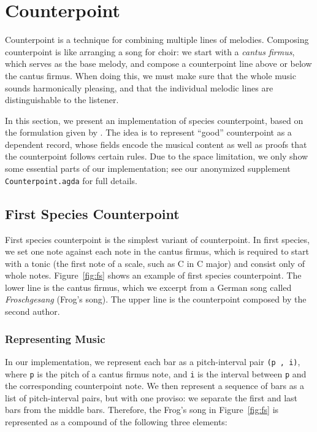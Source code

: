 \section{Counterpoint}
\label{sec:cp}

Counterpoint is a technique for combining multiple lines of melodies.
Composing counterpoint is like arranging a song for choir:
we start with a \emph{cantus firmus}, which serves as the base melody,
and compose a counterpoint line above or below the cantus firmus.
When doing this, we must make sure that the whole music sounds
harmonically pleasing, and that the individual melodic lines are
distinguishable to the listener.

In this section, we present an implementation of species counterpoint,
based on the formulation given by \citet{fux-cp}.
The idea is to represent ``good'' counterpoint  as a dependent record,
whose fields encode the musical content as well as proofs that the
counterpoint follows certain rules.
Due to the space limitation, we only show some essential parts of
our implementation; see our anonymized supplement
\texttt{Counterpoint.agda} for full details.

\subsection{First Species Counterpoint}
\label{sec:cp:fs}

\FS

First species counterpoint is the simplest variant of counterpoint.
In first species, we set one note against each note in the cantus firmus,
which is required to start with a tonic (the first note of a scale,
such as C in C major) and consist only of whole notes.
Figure~\ref{fig:fs} shows an example of first species counterpoint.
The lower line is the cantus firmus, which we excerpt from a German
song called \emph{Froschgesang} (Frog's song).
The upper line is the counterpoint composed by the second author.

\subsubsection{Representing Music}

In our implementation, we represent each bar as a pitch-interval pair
\texttt{(p ,  i)}, where \texttt{p} is the pitch of a cantus firmus note,
and \texttt{i} is the interval between \texttt{p} and the corresponding
counterpoint note.
We then represent a sequence of bars as a list of pitch-interval pairs,
but with one proviso: we separate the first and last bars from the
middle bars.
Therefore, the Frog's song in Figure~\ref{fig:fs} is represented as a
compound of the following three elements:

